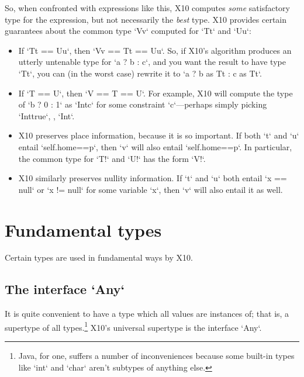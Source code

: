 {So, when confronted with expressions like this, X10 computes {\em some}
satisfactory type for the expression, but not necessarily the {\em best} type.  
X10 provides certain guarantees about the common type \xcd`V{v}` computed for 
\xcd`T{t}` and \xcd`U{u}`: 
\begin{itemize}
\item If \xcd`T{t} == U{u}`, then \xcd`V{v} == T{t} == U{u}`.  So, if X10's
      algorithm produces an utterly untenable type for \xcd`a ? b : c`, and
      you want the result to have type \xcd`T{t}`, you can 
      (in the worst case) rewrite it to 
      \xcd`a ? b as T{t} : c as T{t}`.
\item If \xcd`T == U`, then \xcd`V == T == U`.  For example, 
      X10 will compute the type of \xcd`b ? 0 : 1` as 
      \xcd`Int{c}` for some constraint \xcd`c`---perhaps simply 
      picking \xcd`Int{true}`, \viz, \xcd`Int`. 
\item X10 preserves place information, because it is so important. If both
      \xcd`t` and \xcd`u` entail \xcd`self.home==p`, then  
      \xcd`v` will also entail \xcd`self.home==p`.  In particular, the common
      type for \xcd`T!` and \xcd`U!` has the form \xcd`V!`. 
\item X10 similarly preserves nullity information.  If \xcd`t` and \xcd`u`
      both entail \xcd`x == null` or \xcd`x != null` for some variable
      \xcd`x`, then \xcd`v` will also entail it as well.

\end{itemize}


\section{Fundamental types}

Certain types are used in fundamental ways by X10.  

\subsection{The interface \xcd`Any`}

It is quite convenient to have a type which all values are instances of; that
is, a supertype of all types.\footnote{Java, for one, suffers a number of
  inconveniences because some built-in types like \xcd`int` and \xcd`char`
  aren't subtypes of anything else.}  X10's universal supertype is the
  interface \xcd`Any`. 

}
